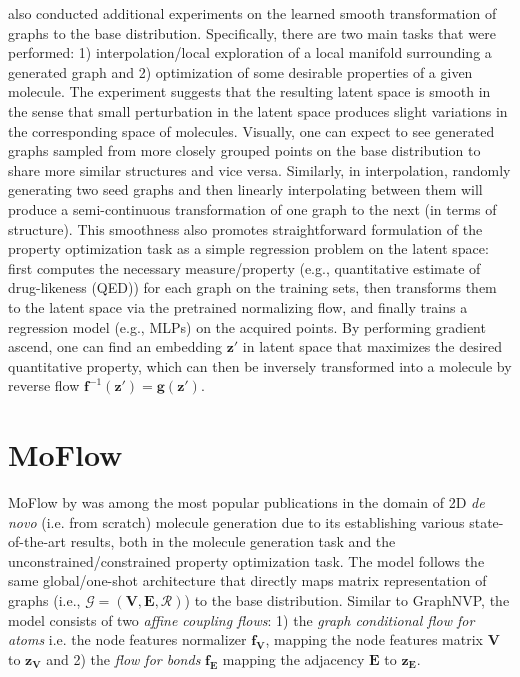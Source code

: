 \citep{madhawaGraphNVPInvertibleFlow2019} also conducted additional experiments
on the learned smooth transformation of graphs to the base distribution.
Specifically, there are two main tasks that were performed: 1)
interpolation/local exploration of a local manifold surrounding a generated
graph and 2) optimization of some desirable properties of a given molecule. The
experiment suggests that the resulting latent space is smooth in the sense that
small perturbation in the latent space produces slight variations in the
corresponding space of molecules. Visually, one can expect to see generated
graphs sampled from more closely grouped points on the base distribution to
share more similar structures and vice versa. Similarly, in interpolation,
randomly generating two seed graphs and then linearly interpolating between them
will produce a semi-continuous transformation of one graph to the next (in terms
of structure). This smoothness also promotes straightforward formulation of the
property optimization task as a simple regression problem on the latent space:
first computes the necessary measure/property (e.g., quantitative estimate of
drug-likeness (QED)) for each graph on the training sets, then transforms them
to the latent space via the pretrained normalizing flow, and finally trains a
regression model (e.g., MLPs) on the acquired points. By performing gradient
ascend, one can find an embedding $\mathbf{z}'$ in latent space that maximizes
the desired quantitative property, which can then be inversely transformed into
a molecule by reverse flow $\mathbf{f}^{-1}(\mathbf{z'}) =
\mathbf{g}(\mathbf{z'})$.

\section{MoFlow}

MoFlow by \citep{zangMoFlowInvertibleFlow2020} was among the most popular
publications in the domain of 2D \textit{de novo} (i.e. from scratch) molecule
generation due to its establishing various state-of-the-art results, both in the
molecule generation task and the unconstrained/constrained property optimization
task. The model follows the same global/one-shot architecture that directly maps
matrix representation of graphs (i.e., $\mathcal{G} = (\mathbf{V}, \mathbf{E},
\mathcal{R})$) to the base distribution. Similar to GraphNVP, the model consists
of two \textit{affine coupling flows}: 1) the \textit{graph conditional flow for
atoms} i.e. the node features normalizer $\mathbf{f}_{\mathbf{V}}$, mapping the
node features matrix $\mathbf{V}$ to $\mathbf{z}_{\mathbf{V}}$ and 2) the
\textit{flow for bonds} $\mathbf{f}_{\mathbf{E}}$ mapping the adjacency
$\mathbf{E}$ to $\mathbf{z}_{\mathbf{E}}$.


